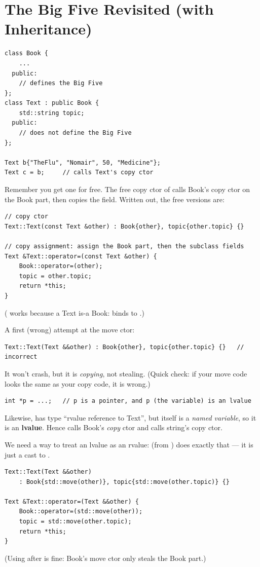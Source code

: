 \section{The Big Five Revisited (with Inheritance)}
\begin{lstlisting}[style=cpp]
class Book {
    ...
  public:
    // defines the Big Five
};
class Text : public Book {
    std::string topic;
  public:
    // does not define the Big Five
};

Text b{"TheFlu", "Nomair", 50, "Medicine"};
Text c = b;     // calls Text's copy ctor
\end{lstlisting}
Remember you get one for free. The free copy ctor of  calls Book's
copy ctor on the Book part, then copies the  field. Written out, the
free versions are:
\begin{lstlisting}[style=cpp]
// copy ctor
Text::Text(const Text &other) : Book{other}, topic{other.topic} {}

// copy assignment: assign the Book part, then the subclass fields
Text &Text::operator=(const Text &other) {
    Book::operator=(other);
    topic = other.topic;
    return *this;
}
\end{lstlisting}
( works because a Text is-a Book:  binds to
.)

A first (wrong) attempt at the move ctor:
\begin{lstlisting}[style=cpp]
Text::Text(Text &&other) : Book{other}, topic{other.topic} {}   // incorrect
\end{lstlisting}
It won't crash, but it is \emph{copying}, not stealing. (Quick check: if your move
code looks the same as your copy code, it is wrong.)

\begin{aside}
\begin{lstlisting}[style=cpp]
int *p = ...;   // p is a pointer, and p (the variable) is an lvalue
\end{lstlisting}
Likewise,  has type ``rvalue reference to Text'', but 
itself is a \emph{named variable}, so it is an \textbf{lvalue}. Hence
 calls Book's \emph{copy} ctor and 
calls string's copy ctor.
\end{aside}

We need a way to treat an lvalue as an rvalue:  (from
) does exactly that --- it is just a cast to .
\begin{lstlisting}[style=cpp]
Text::Text(Text &&other)
    : Book{std::move(other)}, topic{std::move(other.topic)} {}

Text &Text::operator=(Text &&other) {
    Book::operator=(std::move(other));
    topic = std::move(other.topic);
    return *this;
}
\end{lstlisting}
(Using  after  is fine: Book's move ctor
only steals the Book part.)

